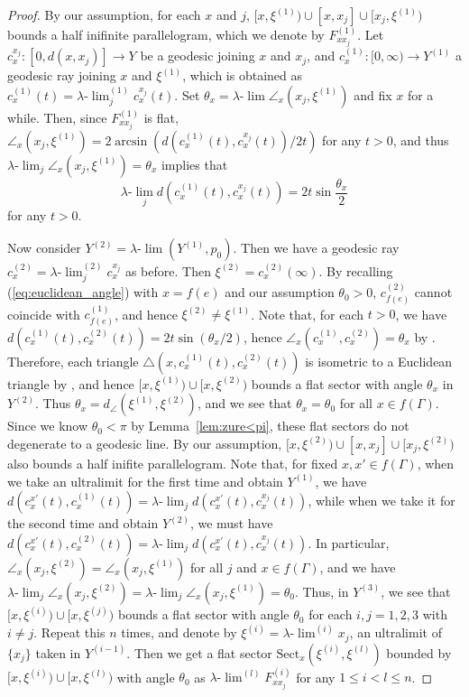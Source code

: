 \documentclass[12pt]{amsart}
\numberwithin{equation}{section}
\theoremstyle{plain}
\theoremstyle{definition}
\theoremstyle{remark}
\newcommand{\uulim}[1][]{\lambda{\text{-}}\!{\lim}^{(#1)}}
\newcommand{\ulim}{\lambda{\text{-}}\!\lim}
\newcommand{\xxi}[1]{\xi^{(#1)}}
\newcommand{\ray}[1]{[#1)}
\newcommand{\cc}[2]{c_{#1}^{#2}}
\newcommand{\tri}[3]{\triangle(#1,#2,#3)}
\newcommand{\sect}[3][]{\mathrm{Sect}_{#1}(#2,#3)}
\newcommand{\zure}{\theta_0}
\begin{document}
\begin{proof}
 By our assumption, for each $x$ and $j$, 
 $\ray{x,\xxi{1}} \cup [x,x_j]\cup \ray{x_j,\xxi{1}}$
 bounds a half inifinite parallelogram, 
 which we denote by $F_{xx_j}^{(1)}$.
 Let $\cc{x}{x_j} \colon [0,d(x,x_j)]\rightarrow Y$ be a geodesic joining
 $x$ and $x_j$, and 
 $\cc{x}{(1)}\colon \ray{0,\infty}\rightarrow Y^{(1)}$ a geodesic ray
 joining $x$ and $\xxi{1}$, which is obtained as 
 $\cc{x}{(1)}(t)=\uulim[1]_j \cc{x}{x_j}(t)$. 
 Set $\theta_x = \ulim \angle_{x}(x_j,\xxi{1})$ and fix $x$ for a while. 
 Then, since $F_{xx_j}^{(1)}$ is flat, 
 $\angle_{x}(x_j, \xxi{1})=
 2\arcsin \left(d(\cc{x}{(1)}(t),\cc{x}{x_j}(t))/2t\right)$
 for any $t>0$, 
 and thus $\ulim_j \angle_{x} (x_j,\xxi{1})=\theta_x$ 
 implies that 
 \begin{equation}
 \label{eq:euclidean_angle}
  \ulim_j d(\cc{x}{(1)}(t),\cc{x}{x_j}(t)) = 2t\sin \frac{\theta_x}{2}
 \end{equation}
 for any $t>0$. 

 Now consider $Y^{(2)}=\ulim (Y^{(1)},p_0)$. 
 Then we have a geodesic ray $\cc{x}{(2)} = \uulim[2]_j \cc{x}{x_j}$ as
 before.  
 Then $\xxi{2}=\cc{x}{(2)}(\infty)$. 
 By recalling (\ref{eq:euclidean_angle}) with $x=f(e)$ and our
 assumption $\zure>0$, $\cc{f(e)}{(2)}$ cannot coincide with
 $\cc{f(e)}{(1)}$, and hence $\xxi{2}\not= \xxi{1}$. 
 Note that, for each $t>0$, we have 
 $d(\cc{x}{(1)}(t),\cc{x}{(2)}(t))=2t \sin (\theta_x/2)$, hence
 $\angle_{x}(\cc{x}{(1)}, \cc{x}{(2)})=\theta_x$ by
 \cite[p.~184, 3.1 Proposition]{bridson-haefliger}. 
 Therefore, each triangle
 $\tri{x}{\cc{x}{(1)}(t)}{\cc{x}{(2)}(t)}$ is isometric to a
 Euclidean triangle by \cite[p.~180 2.9 Proposition]{bridson-haefliger}, 
 and hence $\ray{x,\xxi{1}} \cup \ray{x,\xxi{2}}$ bounds a flat
 sector with angle $\theta_x$ in $Y^{(2)}$. 
 Thus $\theta_x=d_{\angle}(\xxi{1},\xxi{2})$, and
 we see that $\theta_x=\zure$ for all $x \in f(\Gamma)$. 
 Since we know $\zure<\pi$ by Lemma~\ref{lem:zure<pi}, 
 these flat sectors do not degenerate to a geodesic line. 
 By our assumption, 
 $\ray{x,\xxi{2}}\cup [x,x_j]\cup\ray{x_j,\xxi{2}}$ also bounds 
 a half inifite parallelogram. 
 Note that, for fixed $x,x'\in f(\Gamma)$, when we take an ultralimit for
 the first time and obtain $Y^{(1)}$, 
 we have 
 $d(\cc{x}{x'}(t),\cc{x}{(1)}(t))=\ulim_j d(\cc{x}{x'}(t),\cc{x}{x_j}(t))$, 
 while when we take it for the second time and obtain
 $Y^{(2)}$, we must have 
 $d(\cc{x}{x'}(t),\cc{x}{(2)}(t))=\ulim_j d(\cc{x}{x'}(t), \cc{x}{x_j}(t))$. 
 In particular, 
 $\angle_{x}(x_j, \xxi{2})=\angle_{x}(x_j, \xxi{1})$
 for all $j$ and $x\in f(\Gamma)$, and we have 
 $\ulim_j \angle_{x}(x_{j}, \xxi{2})=
 \ulim_j \angle_{x}(x_j, \xxi{1})= \zure$. 
 Thus, in $Y^{(3)}$, we see that
 $\ray{x,\xxi{i}} \cup \ray{x,\xxi{j}}$ bounds 
 a flat sector with angle $\zure$ for each $i,j=1,2,3$ with $i\not=j$. 
 Repeat this $n$ times, and denote by $\xxi{i}=\uulim[i]x_j$, 
 an ultralimit of $\{x_j\}$  taken in $Y^{(i-1)}$.
 Then we get a flat sector $\sect[x]{\xxi{i}}{\xi^{(l)}}$
 bounded by $\ray{x,\xxi{i}} \cup \ray{x,\xi^{(l)}}$ with angle
 $\zure$ as $\uulim[l]F_{xx_j}^{(i)}$ for any $1 \leq i<l \leq n$. 
\end{proof}
\end{document}

